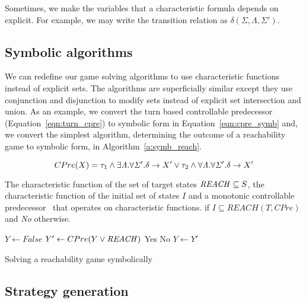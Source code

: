 Sometimes, we make the variables that a characteristic formula depends on explicit. For example, we may write the transition relation as $\delta(\Sigma, \Lambda, \Sigma')$.

\subsection{Symbolic algorithms}

We can redefine our game solving algorithms to use characteristic functions instead of explicit sets. The algorithms are superficially similar except they use conjunction and disjunction to modify sets instead of explicit set intersection and union. As an example, we convert the turn based controllable predecessor (Equation~\ref{eqn:turn_cpre}) to symbolic form in Equation~\ref{eqn:cpre_symb} and, we convert the simplest algorithm, determining the outcome of a reachability game to symbolic form, in Algorithm~\ref{a:symb_reach}.

\begin{equation}
CPre(X) = \tau_1 \wedge \exists \mathit{\Lambda}. \forall \mathit{\Sigma}'. \delta \rightarrow X' \vee \tau_2 \wedge \forall \mathit{\Lambda}. \forall \mathit{\Sigma}'. \delta \rightarrow X' 
\label{eqn:cpre_symb}
\end{equation}

\begin{algorithm}
\begin{algorithmic}

\Require The characteristic function of the set of target states $\mathit{REACH} \subseteq S$, the characteristic function of the initial set of states $I$ and a monotonic controllable predecessor \cpre\ that operates on characteristic functions.
 if $I \subseteq REACH(T, CPre)$ and {\it No} otherwise.

    \State $Y \gets False$
    \Loop
        \State $Y' \gets CPre(Y \vee \mathit{REACH})$
                \State\Return Yes
            \Else
                \State\Return No
            \EndIf
        \EndIf
        \State $Y \gets Y'$
    \EndLoop
\EndFunction

\end{algorithmic}
\caption{Solving a reachability game symbolically}
\label{a:symb_reach}
\end{algorithm}

\subsection{Strategy generation}

